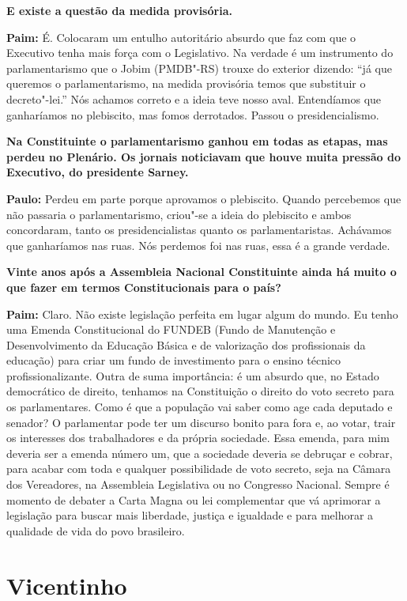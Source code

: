 \textbf{E existe a questão da medida provisória.}

\textbf{Paim:} É. Colocaram um entulho autoritário absurdo que faz com
que o Executivo tenha mais força com o Legislativo. Na verdade é um
instrumento do parlamentarismo que o Jobim (PMDB"-RS) trouxe do exterior
dizendo: ``já que queremos o parlamentarismo, na medida provisória temos
que substituir o decreto"-lei.'' Nós achamos correto e a ideia teve nosso
aval. Entendíamos que ganharíamos no plebiscito, mas fomos derrotados.
Passou o presidencialismo.

\textbf{Na Constituinte o parlamentarismo ganhou em todas as etapas, mas
perdeu no Plenário. Os jornais noticiavam que houve muita pressão do
Executivo, do presidente Sarney.}

\textbf{Paulo:} Perdeu em parte porque aprovamos o plebiscito. Quando
percebemos que não passaria o parlamentarismo, criou"-se a ideia do
plebiscito e ambos concordaram, tanto os presidencialistas quanto os
parlamentaristas. Achávamos que ganharíamos nas ruas. Nós perdemos foi
nas ruas, essa é a grande verdade.

\textbf{Vinte anos após a Assembleia Nacional Constituinte ainda há
muito o que fazer em termos Constitucionais para o país?}

\textbf{Paim:} Claro. Não existe legislação perfeita em lugar algum do
mundo. Eu tenho uma Emenda Constitucional do FUNDEB (Fundo de Manutenção
e Desenvolvimento da Educação Básica e de valorização dos profissionais
da educação) para criar um fundo de investimento para o ensino técnico
profissionalizante. Outra de suma importância: é um absurdo que, no
Estado democrático de direito, tenhamos na Constituição o direito do
voto secreto para os parlamentares. Como é que a população vai saber
como age cada deputado e senador? O parlamentar pode ter um discurso
bonito para fora e, ao votar, trair os interesses dos trabalhadores e da
própria sociedade. Essa emenda, para mim deveria ser a emenda número um,
que a sociedade deveria se debruçar e cobrar, para acabar com toda e
qualquer possibilidade de voto secreto, seja na Câmara dos Vereadores,
na Assembleia Legislativa ou no Congresso Nacional. Sempre é momento de
debater a Carta Magna ou lei complementar que vá aprimorar a legislação
para buscar mais liberdade, justiça e igualdade e para melhorar a
qualidade de vida do povo brasileiro.

\section{Vicentinho}

